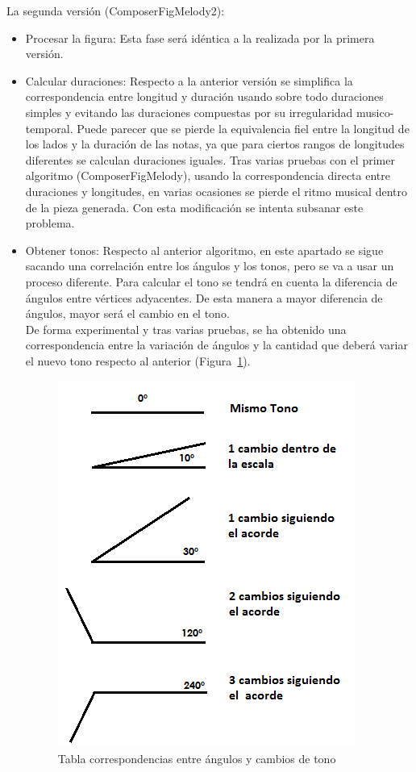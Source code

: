 La segunda versión (ComposerFigMelody2):

\begin{itemize}
	\item Procesar la figura: Esta fase será idéntica a la realizada por la primera versión.

	\item Calcular duraciones: Respecto a la anterior versión se simplifica la correspondencia entre longitud y duración usando sobre todo duraciones simples y evitando las duraciones compuestas por su irregularidad musico-temporal. Puede parecer que se pierde la equivalencia fiel entre la longitud de los lados y la duración de las notas, ya que para ciertos rangos de longitudes diferentes se calculan duraciones iguales. Tras varias pruebas con el primer algoritmo (ComposerFigMelody), usando la correspondencia directa entre duraciones y longitudes, en varias ocasiones se pierde el ritmo musical dentro de la pieza generada. Con esta modificación se intenta subsanar este problema.

	\item Obtener tonos: Respecto al anterior algoritmo, en este apartado se sigue sacando una correlación entre los ángulos y los tonos, pero se va a usar un proceso diferente. Para calcular el tono se tendrá en cuenta la diferencia de ángulos entre vértices adyacentes. De esta manera a mayor diferencia de ángulos, mayor será el cambio en el tono. \\
De forma experimental y tras varias pruebas, se ha obtenido una correspondencia entre la variación de ángulos y la cantidad que deberá variar el nuevo tono respecto al anterior (Figura~\ref{fig:Figura3Voz1}). 

		\begin{figure}[!htbp]
		\centering
		\hspace*{0.0in}
		\includegraphics[scale=0.75]{graphics/tabla-corresp-Tono-Angulo.png}
		\caption{Tabla correspondencias entre ángulos y cambios de tono}
		\label{fig:Figura3Voz1}
		\end{figure}


\end{itemize}
